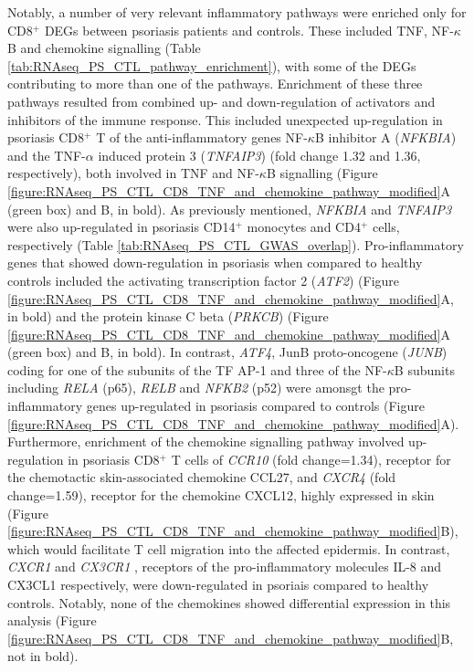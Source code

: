 Notably, a number of very relevant inflammatory pathways were enriched only for CD8$^+$ DEGs between psoriasis patients and controls. These included TNF, NF-$\kappa$B and chemokine signalling (Table \ref{tab:RNAseq_PS_CTL_pathway_enrichment}), with some of the DEGs contributing to more than one of the pathways. Enrichment of these three pathways resulted from combined up- and down-regulation of activators and inhibitors of the immune response. This included unexpected up-regulation in psoriasis CD8$^+$ T of the anti-inflammatory genes NF-$\kappa$B inhibitor A (\textit{NFKBIA}) and the TNF-$\alpha$ induced protein 3 (\textit{TNFAIP3}) (fold change 1.32 and 1.36, respectively), both involved in TNF and NF-$\kappa$B signalling (Figure \ref{figure:RNAseq_PS_CTL_CD8_TNF_and_chemokine_pathway_modified}A (green box) and B, in bold).  As previously mentioned, \textit{NFKBIA} and \textit{TNFAIP3} were also up-regulated in psoriasis CD14$^+$ monocytes and CD4$^+$ cells, respectively (Table \ref{tab:RNAseq_PS_CTL_GWAS_overlap}). Pro-inflammatory genes that showed down-regulation in psoriasis when compared to healthy controls included the activating transcription factor 2 (\textit{ATF2}) (Figure \ref{figure:RNAseq_PS_CTL_CD8_TNF_and_chemokine_pathway_modified}A, in bold) and the protein kinase C beta (\textit{PRKCB}) (Figure \ref{figure:RNAseq_PS_CTL_CD8_TNF_and_chemokine_pathway_modified}A (green box) and B, in bold). In contrast, \textit{ATF4}, JunB proto-oncogene (\textit{JUNB}) coding for one of the subunits of the TF AP-1 and three of the NF-$\kappa$B subunits including \textit{RELA} (p65), \textit{RELB} and \textit{NFKB2} (p52) were amonsgt the pro-inflammatory genes up-regulated in psoriasis compared to controls (Figure \ref{figure:RNAseq_PS_CTL_CD8_TNF_and_chemokine_pathway_modified}A). Furthermore, enrichment of the chemokine signalling pathway involved up-regulation in psoriasis CD8$^+$ T cells of \textit{CCR10} (fold change=1.34), receptor for the chemotactic skin-associated chemokine CCL27, and \textit{CXCR4} (fold change=1.59), receptor for the chemokine CXCL12, highly expressed in skin \parencite{Zgraggen2014} (Figure \ref{figure:RNAseq_PS_CTL_CD8_TNF_and_chemokine_pathway_modified}B), which would facilitate T cell migration into the affected epidermis. In contrast,  \textit{CXCR1} and \textit{CX3CR1} , receptors of the pro-inflammatory molecules IL-8 and CX3CL1 respectively, were down-regulated in psoriais compared to healthy controls. Notably, none of the chemokines showed differential expression in this analysis (Figure \ref{figure:RNAseq_PS_CTL_CD8_TNF_and_chemokine_pathway_modified}B, not in bold). 



